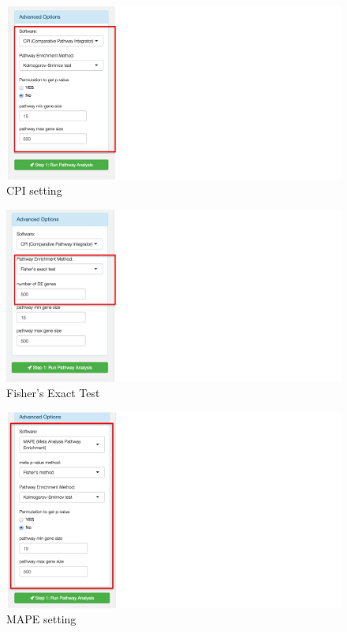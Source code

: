 \begin{figure}[H]
\begin{center}
\includegraphics[scale=0.45]{./figure/metaPath/CPI}
\caption{CPI setting}
\label{fig:CPI}
\end{center}
\end{figure}

\begin{figure}[H]
\begin{center}
\includegraphics[scale=0.45]{./figure/metaPath/FisherExact}
\caption{Fisher's Exact Test}
\label{fig:FisherExact}
\end{center}
\end{figure}

\begin{figure}[H]
\begin{center}
\includegraphics[scale=0.45]{./figure/metaPath/MAPE}
\caption{MAPE setting}
\label{fig:MAPE}
\end{center}
\end{figure}

